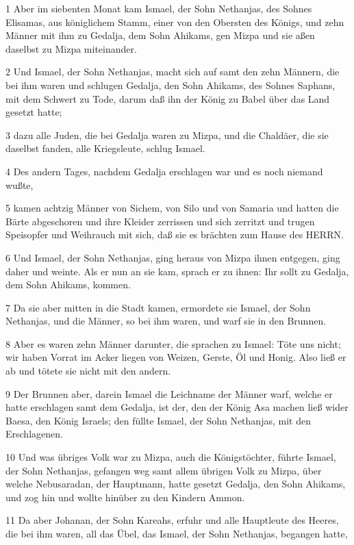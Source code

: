 \par 1 Aber im siebenten Monat kam Ismael, der Sohn Nethanjas, des Sohnes Elisamas, aus königlichem Stamm, einer von den Obersten des Königs, und zehn Männer mit ihm zu Gedalja, dem Sohn Ahikams, gen Mizpa und sie aßen daselbst zu Mizpa miteinander.
\par 2 Und Ismael, der Sohn Nethanjas, macht sich auf samt den zehn Männern, die bei ihm waren und schlugen Gedalja, den Sohn Ahikams, des Sohnes Saphans, mit dem Schwert zu Tode, darum daß ihn der König zu Babel über das Land gesetzt hatte;
\par 3 dazu alle Juden, die bei Gedalja waren zu Mizpa, und die Chaldäer, die sie daselbst fanden, alle Kriegsleute, schlug Ismael.
\par 4 Des andern Tages, nachdem Gedalja erschlagen war und es noch niemand wußte,
\par 5 kamen achtzig Männer von Sichem, von Silo und von Samaria und hatten die Bärte abgeschoren und ihre Kleider zerrissen und sich zerritzt und trugen Speisopfer und Weihrauch mit sich, daß sie es brächten zum Hause des HERRN.
\par 6 Und Ismael, der Sohn Nethanjas, ging heraus von Mizpa ihnen entgegen, ging daher und weinte. Als er nun an sie kam, sprach er zu ihnen: Ihr sollt zu Gedalja, dem Sohn Ahikams, kommen.
\par 7 Da sie aber mitten in die Stadt kamen, ermordete sie Ismael, der Sohn Nethanjas, und die Männer, so bei ihm waren, und warf sie in den Brunnen.
\par 8 Aber es waren zehn Männer darunter, die sprachen zu Ismael: Töte uns nicht; wir haben Vorrat im Acker liegen von Weizen, Gerste, Öl und Honig. Also ließ er ab und tötete sie nicht mit den andern.
\par 9 Der Brunnen aber, darein Ismael die Leichname der Männer warf, welche er hatte erschlagen samt dem Gedalja, ist der, den der König Asa machen ließ wider Baesa, den König Israels; den füllte Ismael, der Sohn Nethanjas, mit den Erschlagenen.
\par 10 Und was übriges Volk war zu Mizpa, auch die Königstöchter, führte Ismael, der Sohn Nethanjas, gefangen weg samt allem übrigen Volk zu Mizpa, über welche Nebusaradan, der Hauptmann, hatte gesetzt Gedalja, den Sohn Ahikams, und zog hin und wollte hinüber zu den Kindern Ammon.
\par 11 Da aber Johanan, der Sohn Kareahs, erfuhr und alle Hauptleute des Heeres, die bei ihm waren, all das Übel, das Ismael, der Sohn Nethanjas, begangen hatte,
